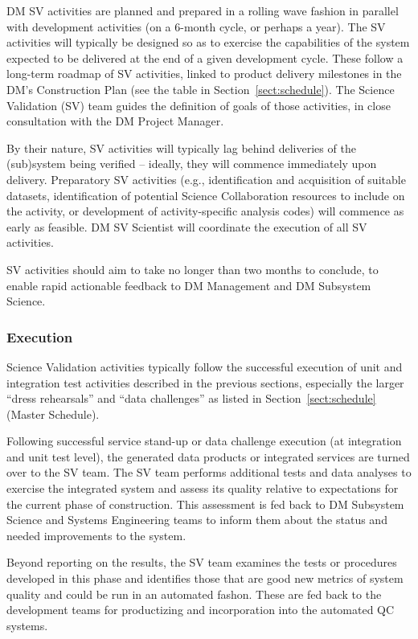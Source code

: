 DM SV activities are planned and prepared in a rolling wave fashion in
parallel with development activities (on a 6-month cycle, or perhaps a
year). The SV activities will typically be designed so as to exercise the
capabilities of the system expected to be delivered at the end of a given
development cycle. These follow a long-term roadmap of SV activities,
linked to product delivery milestones in the DM's Construction Plan (see
the table in Section~\ref{sect:schedule}).  The Science Validation (SV) team
guides the definition of goals of those activities, in close consultation
with the DM Project Manager.

By their nature, SV activities will typically lag behind
deliveries of the (sub)system being verified -- ideally, they will commence
immediately upon delivery. Preparatory SV activities (e.g., identification and
acquisition of suitable datasets, identification of potential Science
Collaboration resources to include on the activity, or development of
activity-specific analysis codes) will commence as early as feasible. DM SV
Scientist will coordinate the execution of all SV activities.

SV activities should aim to take no longer than two months to conclude, to
enable rapid actionable feedback to DM Management and DM Subsystem Science.

\subsubsection{Execution}

Science Validation activities typically follow the successful execution of
unit and integration test activities described in the previous sections,
especially the larger ``dress rehearsals'' and ``data challenges'' as
listed in Section~\ref{sect:schedule} (Master Schedule).

Following successful service stand-up or data challenge execution (at
integration and unit test level), the generated data products or integrated
services are turned over to the SV team.  The SV team performs additional
tests and data analyses to exercise the integrated system and assess its
quality relative to expectations for the current phase of construction.
This assessment is fed back to DM Subsystem Science and Systems Engineering
teams to inform them about the status and needed improvements to the system.

Beyond reporting on the results, the SV team examines the tests or
procedures developed in this phase and identifies those that are good new
metrics of system quality and could be run in an automated fashon.  These
are fed back to the development teams for productizing and incorporation
into the automated QC systems.

